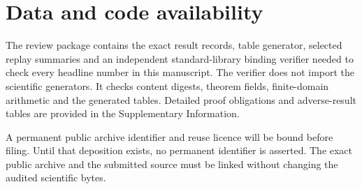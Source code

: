 \section{Data and code availability}

The review package contains the exact result records, table generator, selected replay summaries and an independent standard-library binding verifier needed to check every headline number in this manuscript.  The verifier does not import the scientific generators.  It checks content digests, theorem fields, finite-domain arithmetic and the generated tables.  Detailed proof obligations and adverse-result tables are provided in the Supplementary Information.

A permanent public archive identifier and reuse licence will be bound before filing.  Until that deposition exists, no permanent identifier is asserted.  The exact public archive and the submitted source must be linked without changing the audited scientific bytes.
